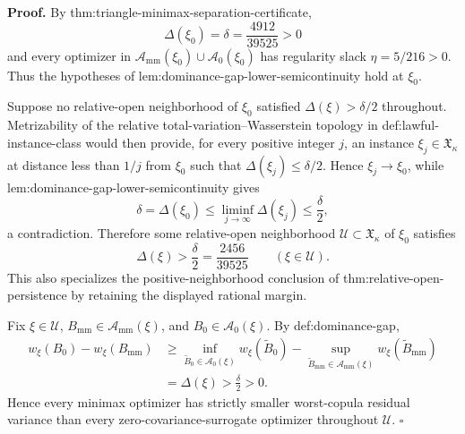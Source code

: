 \textbf{Proof.}
By thm:triangle-minimax-separation-certificate,
\[
 \Delta(\xi_0)=\delta=\frac{4912}{39525}>0
\]
and every optimizer in \(\mathcal A_{\mathrm{mm}}(\xi_0)\cup\mathcal A_0(\xi_0)\) has regularity slack \(\eta=5/216>0\).  Thus the hypotheses of lem:dominance-gap-lower-semicontinuity hold at \(\xi_0\).

Suppose no relative-open neighborhood of \(\xi_0\) satisfied \(\Delta(\xi)>\delta/2\) throughout.  Metrizability of the relative total-variation--Wasserstein topology in def:lawful-instance-class would then provide, for every positive integer \(j\), an instance \(\xi_j\in\mathfrak X_\kappa\) at distance less than \(1/j\) from \(\xi_0\) such that \(\Delta(\xi_j)\le\delta/2\).  Hence \(\xi_j\to\xi_0\), while lem:dominance-gap-lower-semicontinuity gives
\[
 \delta=\Delta(\xi_0)
 \le\liminf_{j\to\infty}\Delta(\xi_j)
 \le\frac{\delta}{2},
\]
a contradiction.  Therefore some relative-open neighborhood \(\mathcal U\subset\mathfrak X_\kappa\) of \(\xi_0\) satisfies
\[
 \Delta(\xi)>\frac{\delta}{2}=\frac{2456}{39525}
 \qquad(\xi\in\mathcal U).
\]
This also specializes the positive-neighborhood conclusion of thm:relative-open-persistence by retaining the displayed rational margin.

Fix \(\xi\in\mathcal U\), \(B_{\mathrm{mm}}\in\mathcal A_{\mathrm{mm}}(\xi)\), and \(B_0\in\mathcal A_0(\xi)\).  By def:dominance-gap,
\[
 \begin{split}
 w_\xi(B_0)-w_\xi(B_{\mathrm{mm}})
 &\ge
 \inf_{\widetilde B_0\in\mathcal A_0(\xi)}w_\xi(\widetilde B_0)
 -\sup_{\widetilde B_{\mathrm{mm}}\in\mathcal A_{\mathrm{mm}}(\xi)}
 w_\xi(\widetilde B_{\mathrm{mm}})\\
 &=\Delta(\xi)>\frac{\delta}{2}>0.
 \end{split}
\]
Hence every minimax optimizer has strictly smaller worst-copula residual variance than every zero-covariance-surrogate optimizer throughout \(\mathcal U\). \(\square\)